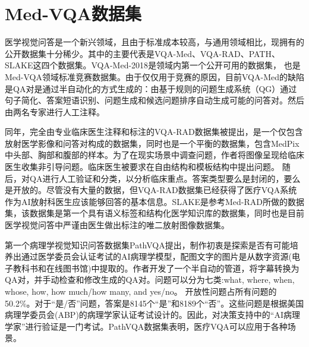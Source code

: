 \section{Med-VQA数据集}
医学视觉问答是一个新兴领域，且由于标准成本较高，与通用领域相比，现拥有的公开数据集十分稀少。其中的主要代表是VQA-Med、VQA-RAD、PATH、SLAKE这四个数据集。VQA-Med-2018\cite{hasan2018overview}是领域内第一个公开可用的数据集，
也是Med-VQA领域标准竞赛数据集。由于仅仅用于竞赛的原因，目前VQA-Med的缺陷是QA对是通过半自动化的方式生成的：由基于规则的问题生成系统（QG）通过句子简化、答案短语识别、问题生成和候选问题排序自动生成可能的问答对。然后由两名专家进行人工注释。

同年，完全由专业临床医生注释和标注的VQA-RAD\cite{lau2018dataset}数据集被提出，是一个仅包含放射医学影像和问答对构成的数据集，同时也是一个平衡的数据集，包含MedPix中头部、胸部和腹部的样本。为了在现实场景中调查问题，作者将图像呈现给临床医生收集非引导问题。临床医生被要求在自由结构和模板结构中提出问题。
随后，对QA进行人工验证和分类，以分析临床重点。答案类型要么是封闭的，要么是开放的。尽管没有大量的数据，但VQA-RAD数据集已经获得了医疗VQA系统作为AI放射科医生应该能够回答的基本信息。SLAKE\cite{liu2021slake}是参考Med-RAD所做的数据集，该数据集是第一个具有语义标签和结构化医学知识库的数据集，同时也是目前医学视觉问答中严谨由医生做出标注的唯二放射图像数据集。

第一个病理学视觉知识问答数据集PathVQA\cite{he2020pathvqa}提出，制作初衷是探索是否有可能培养出通过医学委员会认证考试的AI病理学模型，配图文字的图片是从数字资源(电子教科书和在线图书馆)中提取的。作者开发了一个半自动的管道，将字幕转换为QA对，并手动检查和修改生成的QA对。问题可以分为七类:what, where, when, whose, how, how much/how many, and yes/no。
开放性问题占所有问题的50.2\%。对于“是/否”问题，答案是8145个“是”和8189个“否”。这些问题是根据美国病理学委员会(ABP)的病理学家认证考试设计的。因此，对决策支持中的“AI病理学家”进行验证是一门考试。PathVQA数据集表明，医疗VQA可以应用于各种场景。

